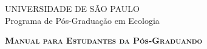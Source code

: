 \begin{titlepage}


\begin{center}
{\LARGE  \sffamily UNIVERSIDADE DE SÃO PAULO \\[1em] 
Programa de Pós-Graduação em Ecologia}
\par
\vspace{0.2\paperheight}
{\Huge \scshape \bfseries Manual para Estudantes da Pós-Graduando \\[2em] 
\the\year}
\par
\vfill
\end{center}
\end{titlepage}

\pagestyle{empty}


